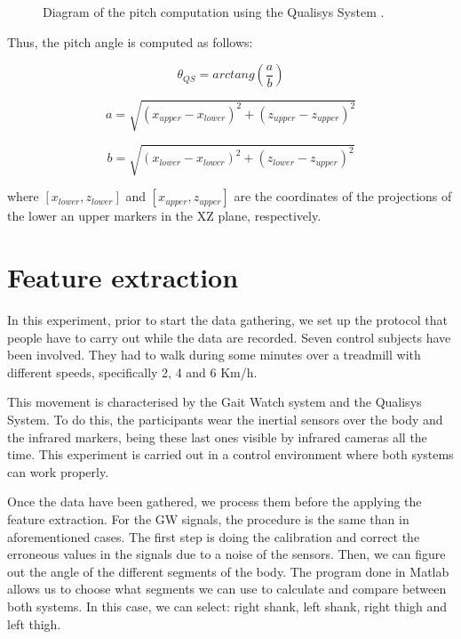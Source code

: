 \begin{figure}[H]
	\centering
	\caption{Diagram of the pitch computation using the Qualisys System \cite{OlivaresBotzel2013}.}
	\label{fig:pitchQS}
\end{figure}

Thus, the pitch angle is computed as follows:

\begin{equation}
\label{angleQS1}
	\theta_{QS}= arctang(\frac{a}{b})
\end{equation}

\begin{equation}
\label{angleQS2}
	a= \sqrt{(x_{upper}-x_{lower})^{2} + (z_{upper}-z_{upper})^{2} }
\end{equation}

\begin{equation}
\label{angleQS3}
	b= \sqrt{(x_{lower}-x_{lower})^{2} + (z_{lower}-z_{upper})^{2} }
\end{equation}

where $ [x_{lower}, z_{lower} ] $ and $ [x_{upper}, z_{upper} ] $ are the coordinates of the projections of the lower an upper markers in the XZ plane, respectively.

\section{Feature extraction}
In this experiment, prior to start the data gathering, we set up the protocol that people have to carry out while the data are recorded. Seven control subjects have been involved. They had to walk during some minutes over a treadmill with different speeds, specifically 2, 4 and 6 Km/h.

This movement is characterised by the Gait Watch system and the Qualisys System. To do this, the participants wear the inertial sensors over the body and the infrared markers, being these last ones visible by infrared cameras all the time. This experiment is carried out in a control environment where both systems can work properly.

Once the data have been gathered, we process them before the applying the feature extraction. For the GW signals, the procedure is the same than in aforementioned cases. The first step is doing the calibration and correct the erroneous values in the signals due to a noise of the sensors.
Then, we can figure out the angle of the different segments of the body. The program done in Matlab allows us to choose what segments we can use to calculate and compare between both systems. In this case, we can select: right shank, left shank, right thigh and left thigh.

